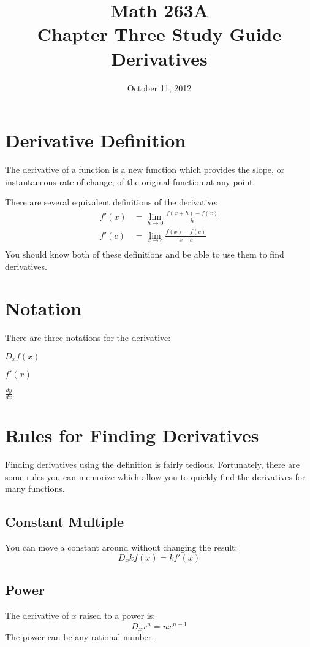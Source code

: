 \documentclass[fleqn]{exam}
\title{Math 263A \\ Chapter Three Study Guide \\ Derivatives}
\date{October 11, 2012}
\author{}
\begin{document}
\maketitle  

\section{Derivative Definition}

The derivative of a function is a new function which provides the slope, or instantaneous rate of change, of the
original function at any point.

There are several equivalent definitions of the derivative:
\begin{align*}
  f'(x) &= \lim_{h \to 0} \frac{f(x + h) - f(x)}{h} \\
  f'(c) &= \lim_{x \to c} \frac{f(x) - f(c)}{x - c} \\
\end{align*}
You should know both of these definitions and be able to use them to find derivatives.  

\section{Notation}
There are three notations for the derivative:
\begin{itemize*}
\item $D_x f(x)$
\item $f'(x)$
\item $\frac{dy}{dx}$
\end{itemize*}

\section{Rules for Finding Derivatives}
Finding derivatives using the definition is fairly tedious.  Fortunately, there are some rules you can memorize which
allow you to quickly find the derivatives for many functions.

\subsection{Constant Multiple}
You can move a constant around without changing the result:
\[
  D_x k f(x) = k f'(x) 
\]

\subsection{Power}
The derivative of $x$ raised to a power is:
\[
  D_x x^n = n x^{n - 1}
\]
The power can be any rational number.
\end{document}

